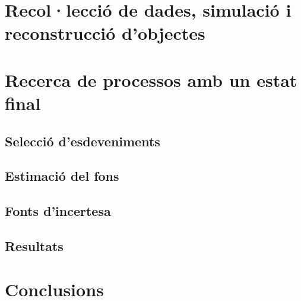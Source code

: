 \section{Recol·lecció de dades, simulació i reconstrucció d'objectes}
\label{chap:resumen_val:Dades_i_Reco}

\section{Recerca de processos \tH amb un estat final \dileptau}
\label{chap:resumen_val:tHq}
\subsection{Selecció d’esdeveniments}
\subsection{Estimació del fons}
\subsection{Fonts d’incertesa}
\subsection{Resultats}
\section{Conclusions}
